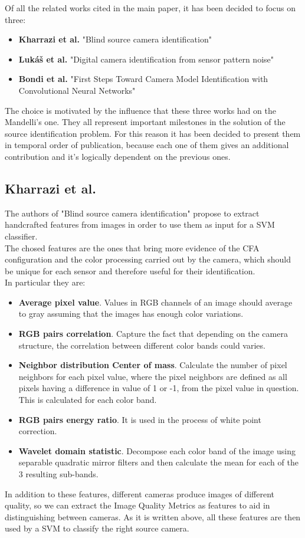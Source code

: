 Of all the related works cited in the main paper, it has been decided to focus on three:
\begin{itemize}
    \item \textbf{Kharrazi et al.} "Blind source camera identification"\cite{Kharrazi}
    \item \textbf{Lukáš et al.} "Digital camera identification from sensor pattern noise"\cite{Lukas}
    \item \textbf{Bondi et al.} "First Steps Toward Camera Model Identification with Convolutional Neural Networks"\cite{Bondi}
\end{itemize}
The choice is motivated by the influence that these three works had on the Mandelli's one.
They all represent important milestones in the solution of the source identification problem.
For this reason it has been decided to present them in temporal order of publication, because each one of them gives an additional contribution and it's logically dependent on the previous ones.

\subsection{Kharrazi et al.}
The authors of "Blind source camera identification" propose to extract handcrafted features from images in order to use them as input for a SVM classifier.
\\The chosed features are the ones that bring more evidence of the CFA configuration and the color processing carried out by the camera, which should be unique for each sensor and therefore useful for their identification.
\\In particular they are:
\begin{itemize}
    \item \textbf{Average pixel value}. Values in RGB channels of an image should average to gray assuming that the images has enough color variations.
    \item \textbf{RGB pairs correlation}. Capture the fact that depending on the camera structure, the correlation between different color bands could varies.
    \item \textbf{Neighbor distribution Center of mass}. Calculate the number of pixel neighbors for each pixel value, where the pixel neighbors are defined as all pixels having a difference in value of 1 or -1, from the pixel value in question. This is calculated for each color band.
    \item \textbf{RGB pairs energy ratio}. It is used in the process of white point correction.
    \item \textbf{Wavelet domain statistic}. Decompose each color band of the image using separable quadratic mirror filters and then calculate the mean for each of the 3 resulting sub-bands.
\end{itemize}
In addition to these features, different cameras produce images of different quality, so we can extract the Image Quality Metrics as features to aid in distinguishing between cameras. 
As it is written above, all these features are then used by a SVM to classify the right source camera.

